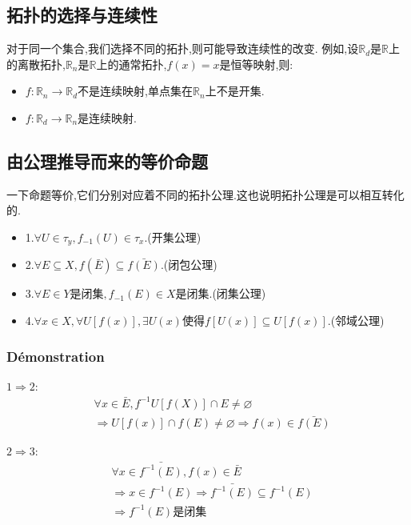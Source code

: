 \documentclass[12pt, a4paper, oneside]{ctexbook}
\begin{document}
  \subsection{拓扑的选择与连续性}
  对于同一个集合,我们选择不同的拓扑,则可能导致连续性的改变.
  例如,设$\mathbb{R}_d$是$\mathbb{R}$上的离散拓扑,$\mathbb{R}_n$是$\mathbb{R}$上的通常拓扑,$f(x)=x$是恒等映射,则:
  \begin{itemize}
    \item $f:\mathbb{R}_n\rightarrow \mathbb{R}_d$不是连续映射,单点集在$\mathbb{R}_n$上不是开集.
    \item $f:\mathbb{R}_d\rightarrow \mathbb{R}_n$是连续映射.
  \end{itemize}
  \subsection{由公理推导而来的等价命题}
  一下命题等价,它们分别对应着不同的拓扑公理.这也说明拓扑公理是可以相互转化的.
  \begin{itemize}
    \item 1.$\forall U\in\tau_y,f_{-1}(U)\in\tau_x$.(开集公理)
    \item 2.$\forall E\subseteq X,f(\bar{E})\subseteq \bar{f(E)}$.(闭包公理)
    \item 3.$\forall E\in Y\text{是闭集},f_{-1}(E)\in X\text{是闭集}$.(闭集公理)
    \item 4.$\forall x\in X, \forall U[f(x)], \exists U(x)\text{使得}f[U(x)]\subseteq U[f(x)]$.(邻域公理)
  \end{itemize}
  \subsubsection{Démonstration}
  $1\Rightarrow 2$:
  $$
  \begin{aligned}&
    \forall x\in \bar{E},f^{-1}U[f(X)]\cap E\neq\varnothing\\&
    \Rightarrow U[f(x)]\cap f(E)\neq\varnothing\Rightarrow f(x)\in \bar{f(E)}
    \end{aligned}
  $$


  $2\Rightarrow 3$:
  $$
  \begin{aligned}&
    \forall x\in \bar{f^{-1}(E)},f(x)\in \bar{E}\\&
    \Rightarrow x\in f^{-1}(E)\Rightarrow\bar{f^{-1}(E)}\subseteq f^{-1}(E)\\&
    \Rightarrow f^{-1}(E)\text{是闭集}
    \end{aligned}
  $$
\end{document}
